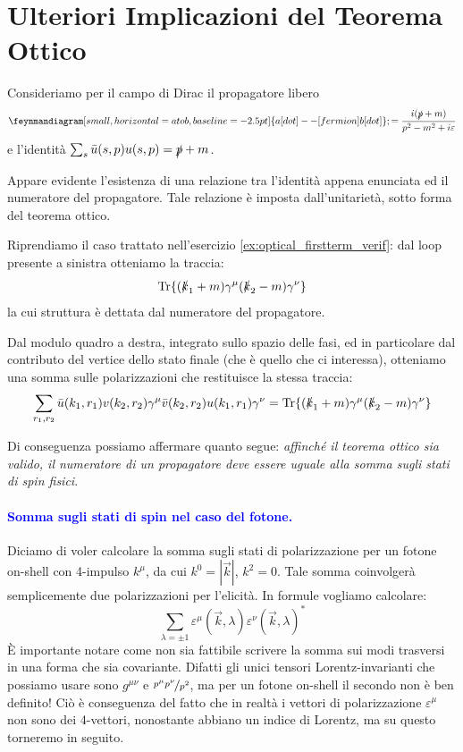 \documentclass[../main.tex]{subfiles}
\begin{document}
\section{Ulteriori Implicazioni del Teorema Ottico}

Consideriamo per il campo di Dirac il propagatore libero 
\[
\feynmandiagram[small, horizontal=a to b, baseline=\plusheight]{ a[dot] --[fermion] b[dot]};
= \frac{i(\slashed p + m)}{p^2 - m^2 +i\varepsilon}
\]
e l'identità \(\sum_s \bar u(s,p)u(s,p) = \slashed p+m \).

Appare evidente l'esistenza di una relazione tra l'identità appena enunciata ed il numeratore del propagatore. Tale relazione è imposta dall'unitarietà, sotto forma del teorema ottico.

Riprendiamo il caso trattato nell'esercizio \ref{ex:optical_firstterm_verif}: dal loop presente a sinistra otteniamo la traccia:
\[
\Tr{(\slashed k_1 + m)\gamma^\mu(\slashed k_2 - m)\gamma^\nu}
\]
la cui struttura è dettata dal numeratore del propagatore.

Dal modulo quadro a destra, integrato sullo spazio delle fasi, ed in particolare dal contributo del vertice dello stato finale (che è quello che ci interessa), otteniamo una somma sulle polarizzazioni che restituisce la stessa traccia:
\[
\sum_{r_1,r_2}\bar u(k_1,r_1)v(k_2,r_2) \gamma^\mu\bar v(k_2,r_2)u(k_1,r_1)\gamma^\nu = \Tr{(\slashed k_1 + m)\gamma^\mu(\slashed k_2 - m)\gamma^\nu} 
\]

Di conseguenza possiamo affermare quanto segue: \textit{affinché il teorema ottico sia valido, il numeratore di un propagatore deve essere uguale alla somma sugli stati di spin fisici}.

\paragraph{\textcolor{blue}{Somma sugli stati di spin nel caso del fotone.}} Diciamo di voler calcolare la somma sugli stati di polarizzazione per un fotone on-shell con 4-impulso \(k^\mu\), da cui \(k^0=|\Vec{k}|\), \(k^2=0\). Tale somma coinvolgerà semplicemente due polarizzazioni per l'elicità. In formule vogliamo calcolare:
\[
\sum_{\lambda=\pm1} \varepsilon^\mu(\Vec{k}, \lambda)\varepsilon^\nu(\Vec{k}, \lambda)^\ast
\]
È importante notare come non sia fattibile scrivere la somma sui modi trasversi in una forma che sia covariante. Difatti gli unici tensori Lorentz-invarianti che possiamo usare sono \(g^{\mu\nu}\) e \(\nicefrac{p^\mu p^\nu}{p^2}\), ma per un fotone on-shell il secondo non è ben definito! Ciò è conseguenza del fatto che in realtà i vettori di polarizzazione \(\varepsilon^\mu\) non sono dei 4-vettori, nonostante abbiano un indice di Lorentz, ma su questo torneremo in seguito.
\end{document}

